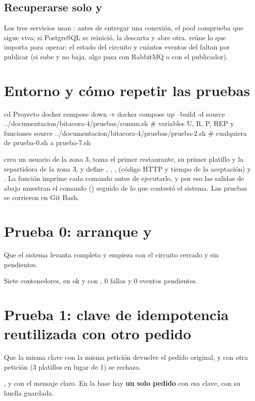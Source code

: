 \documentclass[11pt]{article}
\newcommand{\evidencia}[1]{}
\begin{document}
\subsection{Recuperarse solo y }

Los tres servicios usan : antes de entregar
una conexión, el pool comprueba que sigue viva; si PostgreSQL se reinició, la descarta y abre otra.
 reúne lo que importa para operar: el estado del circuito y cuántos eventos del
 faltan por publicar (si sube y no baja, algo pasa con RabbitMQ o con el publicador).

\section{Entorno y cómo repetir las pruebas}

\begin{comando}
cd Proyecto
docker compose down -v
docker compose up --build -d
source ../documentacion/bitacora-4/pruebas/comun.sh      # variables U, R, P, REP y funciones
source ../documentacion/bitacora-4/pruebas/prueba-2.sh   # cualquiera de prueba-0.sh a prueba-7.sh
\end{comando}

 crea un usuario de la zona 3, toma el primer restaurante, su primer platillo y la
repartidora de la zona 3, y define , , ,
 (código HTTP y tiempo de la aceptación) y . La función 
imprime cada comando antes de ejecutarlo, y por eso las salidas de abajo muestran el comando
() seguido de lo que contestó el sistema. Las pruebas se corrieron en Git Bash.

\section{Prueba 0: arranque y }
\queria Que el sistema levanta completo y  empieza con el circuito cerrado y sin pendientes.
\evidencia{prueba-0.txt}
\observado Siete contenedores,  en ok y  con , 0 fallos y 0 eventos
pendientes. \hfill\ok

\section{Prueba 1: clave de idempotencia reutilizada con otro pedido}
\queria Que la misma clave con la misma petición devuelve el pedido original, y con otra petición (3
platillos en lugar de 1) se rechaza.
\evidencia{prueba-1.txt}
\observado {},  y  con el mensaje claro. En la base hay \textbf{un solo pedido}
con esa clave, con su huella guardada. \hfill\ok
\end{document}
